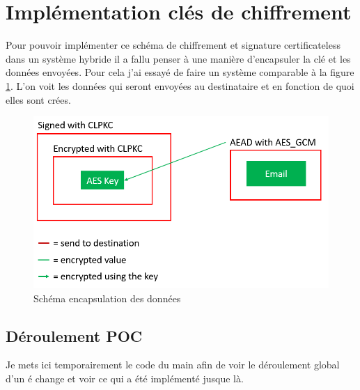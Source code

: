 \section{Implémentation clés  de chiffrement}
Pour pouvoir implémenter ce schéma de chiffrement et signature certificateless dans un système hybride il a fallu penser à une manière d'encapsuler la clé et les données envoyées. Pour cela j'ai essayé de faire un système comparable à la figure \ref{fig:encapsulate}. L'on voit les données qui seront envoyées au destinataire et en fonction de quoi elles sont crées.
\begin{figure}[h!]
	\centering
	\includegraphics[width=12cm]{images/schemaEncapsulation.png}
	\caption{Schéma encapsulation des données}
	\label{fig:encapsulate}
\end{figure}

\subsection{Déroulement POC}
Je mets ici temporairement le code du main afin de voir le déroulement global d'un é change et voir ce qui a été implémenté jusque là.
\inputminted[linenos, numbersep=4pt,fontsize=\footnotesize, breaklines=true]{C}{source_code/main.c}